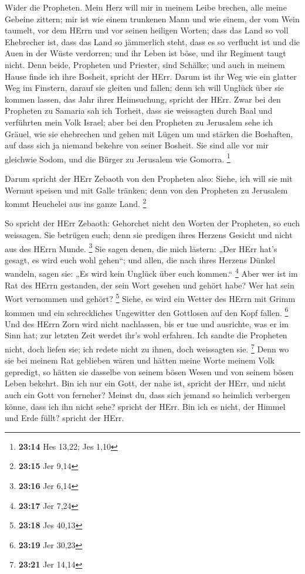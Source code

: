  Wider die Propheten. Mein Herz will mir in meinem Leibe
brechen, alle meine Gebeine zittern; mir ist wie einem trunkenen Mann
und wie einem, der vom Wein taumelt, vor dem HErrn und vor seinen
heiligen Worten;  dass das Land so voll Ehebrecher ist,
dass das Land so jämmerlich steht, dass es so verflucht ist und die Auen
in der Wüste verdorren; und ihr Leben ist böse, und ihr Regiment taugt
nicht.  Denn beide, Propheten und Priester, sind Schälke;
und auch in meinem Hause finde ich ihre Bosheit, spricht der HErr.
 Darum ist ihr Weg wie ein glatter Weg im Finstern, darauf
sie gleiten und fallen; denn ich will Unglück über sie kommen lassen,
das Jahr ihrer Heimsuchung, spricht der HErr.  Zwar bei den
Propheten zu Samaria sah ich Torheit, dass sie weissagten durch Baal und
verführten mein Volk Israel;  aber bei den Propheten zu
Jerusalem sehe ich Gräuel, wie sie ehebrechen und gehen mit Lügen um und
stärken die Boshaften, auf dass sich ja niemand bekehre von seiner
Bosheit. Sie sind alle vor mir gleichwie Sodom, und die Bürger zu
Jerusalem wie Gomorra. \footnote{\textbf{23:14} Hes 13,22; Jes 1,10}

 Darum spricht der HErr Zebaoth von den Propheten also:
Siehe, ich will sie mit Wermut speisen und mit Galle tränken; denn von
den Propheten zu Jerusalem kommt Heuchelei aus ins ganze Land.
\footnote{\textbf{23:15} Jer 9,14}

 So spricht der HErr Zebaoth: Gehorchet nicht den Worten
der Propheten, so euch weissagen. Sie betrügen euch; denn sie predigen
ihres Herzens Gesicht und nicht aus des HErrn Munde. \footnote{\textbf{23:16}
  Jer 6,14}  Sie sagen denen, die mich lästern: „Der HErr
hat's gesagt, es wird euch wohl gehen``; und allen, die nach ihres
Herzens Dünkel wandeln, sagen sie: „Es wird kein Unglück über euch
kommen.`` \footnote{\textbf{23:17} Jer 7,24}  Aber wer ist
im Rat des HErrn gestanden, der sein Wort gesehen und gehört habe? Wer
hat sein Wort vernommen und gehört? \footnote{\textbf{23:18} Jes 40,13}
 Siehe, es wird ein Wetter des HErrn mit Grimm kommen und
ein schreckliches Ungewitter den Gottlosen auf den Kopf fallen.
\footnote{\textbf{23:19} Jer 30,23}  Und des HErrn Zorn
wird nicht nachlassen, bis er tue und ausrichte, was er im Sinn hat; zur
letzten Zeit werdet ihr's wohl erfahren.  Ich sandte die
Propheten nicht, doch liefen sie; ich redete nicht zu ihnen, doch
weissagten sie. \footnote{\textbf{23:21} Jer 14,14}  Denn
wo sie bei meinem Rat geblieben wären und hätten meine Worte meinem Volk
gepredigt, so hätten sie dasselbe von seinem bösen Wesen und von seinem
bösen Leben bekehrt.  Bin ich nur ein Gott, der nahe ist,
spricht der HErr, und nicht auch ein Gott von ferneher? 
Meinst du, dass sich jemand so heimlich verbergen könne, dass ich ihn
nicht sehe? spricht der HErr. Bin ich es nicht, der Himmel und Erde
füllt? spricht der HErr.

